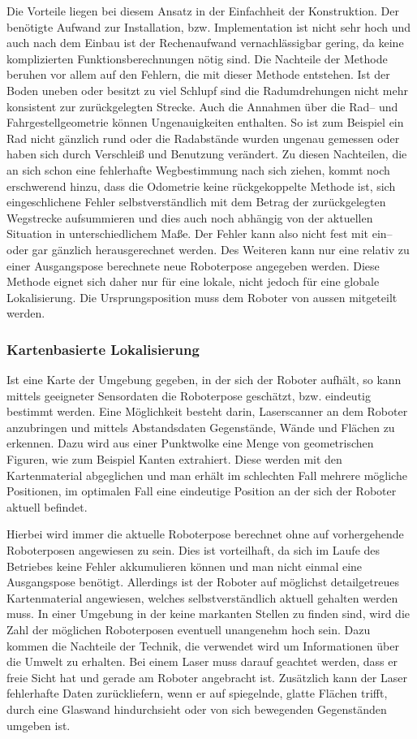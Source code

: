 Die Vorteile liegen bei diesem Ansatz in der Einfachheit der Konstruktion. Der benötigte Aufwand zur Installation, bzw. Implementation ist nicht sehr hoch und auch nach dem Einbau ist der Rechenaufwand vernachlässigbar gering, da keine komplizierten Funktionsberechnungen nötig sind. Die Nachteile der Methode beruhen vor allem auf den Fehlern, die mit dieser Methode entstehen. Ist der Boden uneben oder besitzt zu viel Schlupf sind die Radumdrehungen nicht mehr konsistent zur zurückgelegten Strecke. Auch die Annahmen über die Rad-- und Fahrgestellgeometrie können Ungenauigkeiten enthalten. So ist zum Beispiel ein Rad nicht gänzlich rund oder die Radabstände wurden ungenau gemessen oder haben sich durch Verschleiß und Benutzung verändert. Zu diesen Nachteilen, die an sich schon eine fehlerhafte Wegbestimmung nach sich ziehen, kommt noch erschwerend hinzu, dass die Odometrie keine rückgekoppelte Methode ist, sich eingeschlichene Fehler selbstverständlich mit dem Betrag der zurückgelegten Wegstrecke aufsummieren und dies auch noch abhängig von der aktuellen Situation in unterschiedlichem Maße. Der Fehler kann also nicht fest mit ein-- oder gar gänzlich herausgerechnet werden. Des Weiteren kann nur eine relativ zu einer Ausgangspose berechnete neue Roboterpose angegeben werden. Diese Methode eignet sich daher nur für eine lokale, nicht jedoch für eine globale Lokalisierung. Die Ursprungsposition muss dem Roboter von aussen mitgeteilt werden.

\subsubsection{Kartenbasierte Lokalisierung}

Ist eine Karte der Umgebung gegeben, in der sich der Roboter aufhält, so kann
mittels geeigneter Sensordaten die Roboterpose geschätzt, bzw. eindeutig
bestimmt werden. Eine Möglichkeit besteht darin, Laserscanner an dem Roboter
anzubringen und mittels Abstandsdaten Gegenstände, Wände und Flächen zu erkennen. Dazu wird aus einer Punktwolke eine Menge von geometrischen Figuren, wie zum Beispiel Kanten extrahiert. Diese werden mit den Kartenmaterial abgeglichen und man erhält im schlechten Fall mehrere mögliche Positionen, im optimalen Fall eine eindeutige Position an der sich der Roboter aktuell befindet.

Hierbei wird immer die aktuelle Roboterpose berechnet ohne auf vorhergehende Roboterposen angewiesen zu sein. Dies ist vorteilhaft, da sich im Laufe des Betriebes keine Fehler akkumulieren können und man nicht einmal eine Ausgangspose benötigt. Allerdings ist der Roboter auf möglichst detailgetreues Kartenmaterial angewiesen, welches selbstverständlich aktuell gehalten werden muss. In einer Umgebung in der keine markanten Stellen zu finden sind, wird die Zahl der möglichen Roboterposen eventuell unangenehm hoch sein. Dazu kommen die Nachteile der Technik, die verwendet wird um Informationen über die Umwelt zu erhalten. Bei einem Laser muss darauf geachtet werden, dass er freie Sicht hat und gerade am Roboter angebracht ist. Zusätzlich kann der Laser fehlerhafte Daten zurückliefern, wenn er auf spiegelnde, glatte Flächen trifft, durch eine Glaswand hindurchsieht oder von sich bewegenden Gegenständen umgeben ist.  


